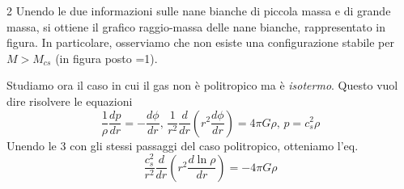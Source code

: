 \documentclass{report}
\begin{document}
    \vspace{0.5cm}

    \begin{multicols}{2}
        Unendo le due informazioni sulle nane bianche di piccola massa e di grande massa, si ottiene il grafico raggio-massa delle nane bianche, rappresentato in figura. In particolare, osserviamo che non esiste una configurazione stabile per $M>M_{cs}$ (in figura posto =1). 

    \columnbreak


    
    \end{multicols}

    Studiamo ora il caso in cui il gas non è politropico ma è \emph{isotermo}. Questo vuol dire risolvere le equazioni
    \begin{equation}
        \frac{1}{\rho}\frac{dp}{dr} = -\frac{d\phi}{dr}, \, \frac{1}{r^2}\frac{d}{dr}\left(r^2 \frac{d\phi}{dr} \right) = 4\pi G \rho, \, p = c_s^2\rho
    \end{equation}
    Unendo le 3 con gli stessi passaggi del caso politropico, otteniamo l'eq. 
    \begin{equation}
        \frac{c_s^2}{r^2}\frac{d}{dr}\left(r^2\frac{d\ln{\rho}}{dr} \right) = -4\pi G\rho 
    \end{equation}
\end{document}
